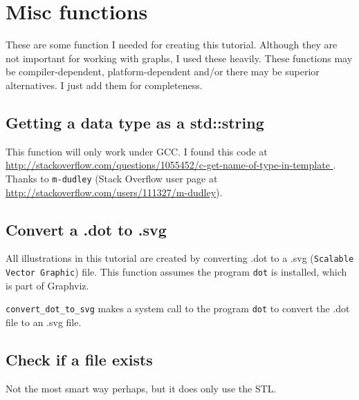 \chapter{Misc functions}

These are some function I needed for creating this tutorial.
Although they are not important for working with graphs, I used these heavily.
These functions may be compiler-dependent, platform-dependent and/or there
may be superior alternatives.
I just add them for completeness.

\section{Getting a data type as a std::string}
\label{subsec:get_type_name}

This function will only work under GCC.
I found this code at 
\url{
  http://stackoverflow.com/questions/1055452/c-get-name-of-type-in-template
}.
Thanks to \verb;m-dudley;
(Stack Overflow user page at \url{http://stackoverflow.com/users/111327/m-dudley}).



\section{Convert a .dot to .svg}
\label{subsec:convert_dot_to_svg}

All illustrations in this tutorial are created by converting .dot to a .svg
(\verb;Scalable Vector Graphic;) file.
This function assumes the program \verb;dot; is installed, which is part of
Graphviz.



\verb;convert_dot_to_svg; makes a system call 
to the program \verb;dot; to convert
the .dot file to an .svg file.

\section{Check if a file exists}
\label{subsec:is_regular_file}

Not the most smart way perhaps, but it does only use the STL.



